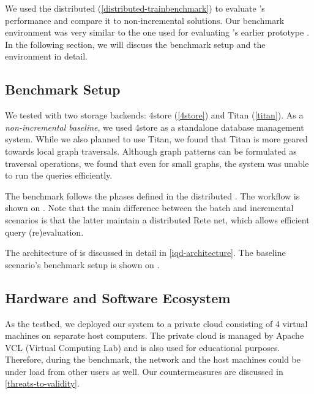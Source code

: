 We used the distributed \tb{} (\autoref{distributed-trainbenchmark}) to evaluate \iqd{}'s performance and compare it to non-incremental solutions. Our benchmark environment was very similar to the one used for evaluating \iqd{}'s earlier prototype \cite{Izso:2013:IIG:2487766.2487772}. In the following section, we will discuss the benchmark setup and the environment in detail.

\subsection{Benchmark Setup}

We tested \iqd{} with two storage backends: 4store (\autoref{4store}) and Titan (\autoref{titan}). As a \emph{non-incremental baseline}, we used 4store as a standalone database management system. While we also planned to use Titan, we found that Titan is more geared towards local graph traversals. Although graph patterns can be formulated as traversal operations, we found that even for small graphs, the system was unable to run the queries efficiently.


The benchmark follows the phases defined in the distributed \tb{}. The workflow is shown on . Note that the main difference between the batch and incremental scenarios is that the latter maintain a distributed Rete net, which allows efficient query (re)evaluation.   

The architecture of \iqd{} is discussed in detail in \autoref{iqd-architecture}. The baseline scenario's benchmark setup is shown on .


\subsection{Hardware and Software Ecosystem}
\label{ecosystem}

As the testbed, we deployed our system to a private cloud consisting of 4 virtual machines on separate host computers. The private cloud is managed by Apache VCL (Virtual Computing Lab) and is also used for educational purposes. Therefore, during the benchmark, the network and the host machines could be under load from other users as well. Our countermeasures are discussed in \autoref{threats-to-validity}.

